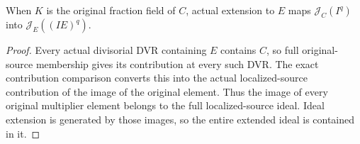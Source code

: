 \begin{theorem}\label{thm:sc0-multiplier-localization-forward}
\leanok
{}
When $K$ is the original fraction field of $C$, actual extension to
$E$ maps $\mathcal J_C(I^q)$ into $\mathcal J_E((IE)^q)$.
\end{theorem}
\begin{proof}
Every actual divisorial DVR containing $E$ contains $C$, so full
original-source membership gives its contribution at every such DVR.
The exact contribution comparison converts this into the actual
localized-source contribution of the image of the original element.
Thus the image of every original multiplier element belongs to the
full localized-source ideal. Ideal extension is generated by those
images, so the entire extended ideal is contained in it.
\end{proof}
